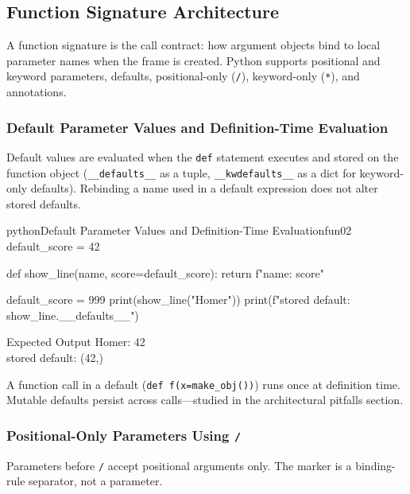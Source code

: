 \subsection{Function Signature Architecture}

A function signature is the call contract: how argument objects bind to local parameter names when the frame is created. Python supports positional and keyword parameters, defaults, positional-only (\texttt{/}), keyword-only (\texttt{*}), and annotations.

\subsubsection{Default Parameter Values and Definition-Time Evaluation}

Default values are evaluated when the \texttt{def} statement executes and stored on the function object (\texttt{\_\_defaults\_\_} as a tuple, \texttt{\_\_kwdefaults\_\_} as a dict for keyword-only defaults). Rebinding a name used in a default expression does not alter stored defaults.

\begin{codebox}[]{python}{Default Parameter Values and Definition-Time Evaluation}{fun02}
default_score = 42

def show_line(name, score=default_score):
    return f"{name}: {score}"

default_score = 999
print(show_line("Homer"))
print(f"stored default: {show_line.__defaults__}")
\end{codebox}


\begin{iobox}{Expected Output}
Homer: 42 \\
stored default: (42,) \\
\end{iobox}




A function call in a default (\texttt{def f(x=make\_obj())}) runs once at definition time. Mutable defaults persist across calls---studied in the architectural pitfalls section.

\subsubsection{Positional-Only Parameters Using \texttt{/}}

Parameters before \texttt{/} accept positional arguments only. The marker is a binding-rule separator, not a parameter.

